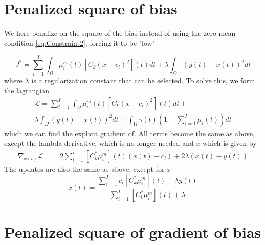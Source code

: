 \documentclass{llncs}
\begin{document}
\section{Penalized square of bias}

We here penalize on the square of the bias instead of using the zero mean condition \ref{eq:Constraint2}, forcing it to be "low"

\begin{equation}
J^* = \sum_{i=1}^{I} \int_\Omega {\mu_{i}^m}(t) [C_k (x - c_i)^2](t) dt + \lambda \int_\Omega (y(t) - x(t))^2 dt
\end{equation}
where $\lambda$ is a regularization constant that can be selected. To solve this, we form the lagrangian
\begin{multline}
\mathcal{L} =
\sum_{i=1}^{I} \int_\Omega {\mu_{i}^m}(t) [C_k (x - c_i)^2](t) dt
+\\
\lambda \int_\Omega (y(t) - x(t))^2 dt
+
\int_\Omega \gamma(t) \left(1 - \sum_{i=1}^{I} \mu_i(t)\right) dt
\end{multline}
which we can find the explicit gradient of. 
All terms become the same as above, except the lambda derivative, which is no longer needed and $x$ which is given by
\begin{align*}
\nabla_{x(t)} \mathcal{L}
=&\
2 \sum_{i=1}^{I} [C_k^* \mu_{i}^m](t) (x(t) - c_i) + 2 \lambda (x(t) - y(t))
\end{align*}
The updates are also the same as above, except for $x$
\begin{equation}
x(t)=
\frac{\sum_{i=1}^{I} c_i [C_k^* \mu_{i}^m](t) + \lambda y(t)}
{\sum_{i=1}^{I} [C_k^* \mu_{i}^m](t) + \lambda}
\end{equation}

\section{Penalized square of gradient of bias}
\end{document}
